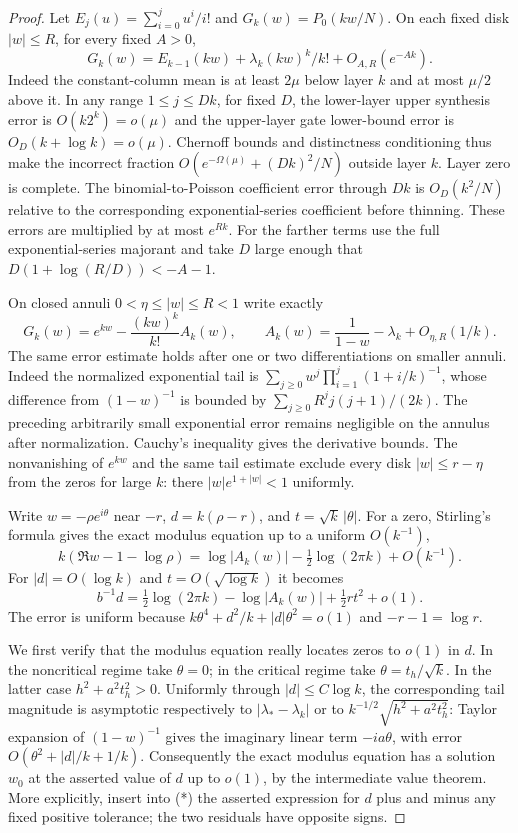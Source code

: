 \begin{proof}
Let \(E_j(u)=\sum_{i=0}^j u^i/i!\) and \(G_k(w)=P_0(kw/N)\). On each fixed disk \(|w|\le R\), for every fixed \(A>0\),
\[
  G_k(w)=E_{k-1}(kw)+\lambda_k(kw)^k/k!+O_{A,R}(e^{-Ak}).
\]
Indeed the constant-column mean is at least \(2\mu\) below layer \(k\) and at most \(\mu/2\) above it. In any range \(1\le j\le Dk\), for fixed \(D\), the lower-layer upper synthesis error is \(O(k2^k)=o(\mu)\) and the upper-layer gate lower-bound error is \(O_D(k+\log k)=o(\mu)\). Chernoff bounds and distinctness conditioning thus make the incorrect fraction \(O(e^{-\Omega(\mu)}+(Dk)^2/N)\) outside layer \(k\). Layer zero is complete. The binomial-to-Poisson coefficient error through \(Dk\) is \(O_D(k^2/N)\) relative to the corresponding exponential-series coefficient before thinning. These errors are multiplied by at most \(e^{Rk}\). For the farther terms use the full exponential-series majorant and take \(D\) large enough that \(D(1+\log(R/D))<-A-1\).

On closed annuli \(0<\eta\le|w|\le R<1\) write exactly
\[
 G_k(w)=e^{kw}-\frac{(kw)^k}{k!}A_k(w),\qquad
 A_k(w)=\frac1{1-w}-\lambda_k+O_{\eta,R}(1/k).
\]
The same error estimate holds after one or two differentiations on smaller annuli. Indeed the normalized exponential tail is
\(\sum_{j\ge0}w^j\prod_{i=1}^j(1+i/k)^{-1}\), whose difference from \((1-w)^{-1}\) is bounded by \(\sum_{j\ge0}R^jj(j+1)/(2k)\). The preceding arbitrarily small exponential error remains negligible on the annulus after normalization. Cauchy's inequality gives the derivative bounds. The nonvanishing of \(e^{kw}\) and the same tail estimate exclude every disk \(|w|\le r-\eta\) from the zeros for large \(k\): there \(|w|e^{1+|w|}<1\) uniformly.

Write \(w=-\rho e^{i\theta}\) near \(-r\), \(d=k(\rho-r)\), and \(t=\sqrt k\,|\theta|\). For a zero, Stirling's formula gives the exact modulus equation up to a uniform \(O(k^{-1})\),
\[
 k(\Re w-1-\log\rho)=\log|A_k(w)|-\tfrac12\log(2\pi k)+O(k^{-1}).
\]
For \(|d|=O(\log k)\) and \(t=O(\sqrt{\log k})\) it becomes
\[
 b^{-1}d=\tfrac12\log(2\pi k)-\log|A_k(w)|+\tfrac12 rt^2+o(1).
 \tag{*}
\]
The error is uniform because \(k\theta^4+ d^2/k+|d|\theta^2=o(1)\) and \(-r-1=\log r\).

We first verify that the modulus equation really locates zeros to \(o(1)\) in \(d\). In the noncritical regime take \(\theta=0\); in the critical regime take \(\theta=t_h/\sqrt k\). In the latter case \(h^2+a^2t_h^2>0\). Uniformly through \(|d|\le C\log k\), the corresponding tail magnitude is asymptotic respectively to \(|\lambda_*-\lambda_k|\) or to \(k^{-1/2}\sqrt{h^2+a^2t_h^2}\): Taylor expansion of \((1-w)^{-1}\) gives the imaginary linear term \(-ia\theta\), with error \(O(\theta^2+|d|/k+1/k)\). Consequently the exact modulus equation has a solution \(w_0\) at the asserted value of \(d\) up to \(o(1)\), by the intermediate value theorem. More explicitly, insert into (*) the asserted expression for \(d\) plus and minus any fixed positive tolerance; the two residuals have opposite signs.


\end{proof}
